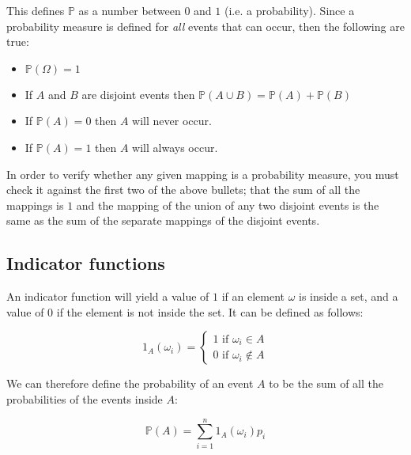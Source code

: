 This defines $\mathbb{P}$ as a number between $0$ and $1$ (i.e. a probability).
Since a probability measure is defined for {\it all} events that can occur, then
the following are true:

\begin{itemize}
	\item $\mathbb{P}(\Omega) = 1$
	\item If $A$ and $B$ are disjoint events then $\mathbb{P}(A \cup B) = \mathbb{P}(A) + \mathbb{P}(B)$
	\item If $\mathbb{P}(A) = 0$ then $A$ will never occur.
	\item If $\mathbb{P}(A) = 1$ then $A$ will always occur.
\end{itemize}


In order to verify whether any given mapping is a probability measure, you must
check it against the first two of the above bullets; that the sum of all the
mappings is $1$ and the mapping of the union of any two disjoint events is the
same as the sum of the separate mappings of the disjoint events.

\subsection{Indicator functions}

An indicator function will yield a value of $1$ if an element $\omega$ is inside
a set, and a value of $0$ if the element is not inside the set. It can be
defined as follows:

\begin{dmath*}
	1_A(\omega_i) = \begin{cases} 
						1\textrm{ if }\omega_i \in A\\
						0\textrm{ if }\omega_i \not\in A
					\end{cases}
\end{dmath*}

We can therefore define the probability of an event $A$ to be the sum of all the
probabilities of the events inside $A$:

\begin{dmath*}
	\mathbb{P}(A) = \sum\limits_{i=1}^n1_A(\omega_i)p_i
\end{dmath*}


